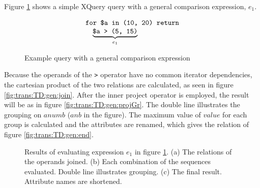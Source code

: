 \begin{myExample}
Figure \ref{fig:trans:TD:genCompQu} shows a simple XQuery query with a general comparison expression, $e_1$.
\begin{figure}[h]
\centering
\begin{equation*}
\begin{array}{l}
\mbox{\texttt{for \$a in (10, 20) return}} \\ \quad
\underbrace{\mbox{\texttt{\$a > (5, 15)}}}_{e_1}
\end{array}
\end{equation*}
\caption{Example query with a general comparison expression \label{fig:trans:TD:genCompQu}}
\end{figure}
 
Because the operands of the \texttt{>} operator have no common iterator dependencies, the cartesian product of the
two relations are calculated, as seen in figure \ref{fig:trans:TD:gen:join}. After the inner \textsf{project}
operator is employed, the result will be as in figure \ref{fig:trans:TD:gen:projGr}. The double line illustrates
the grouping on $anumb$ ($anb$ in the figure). The maximum value of $value$ for each group is calculated and the
attributes are renamed, which gives the relation of figure \ref{fig:trans:TD:gen:end}.

\begin{figure}[h]
\centering
{}
\qquad
{}
\qquad
{}
\caption[Results of evaluating $e_1$ in figure \ref{fig:trans:TD:genCompQu}]{Results of evaluating expression $e_1$
in figure \ref{fig:trans:TD:genCompQu}. (a) The relations of the operands joined. (b) Each combination of the
sequences evaluated. Double line illustrates grouping. (c) The final result. Attribute names are shortened.
\label{fig:trans:TD:genCompRes}}
\end{figure}
 
\end{myExample}
